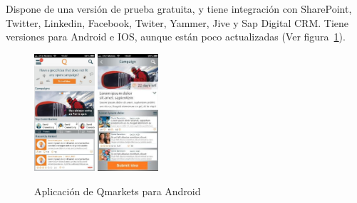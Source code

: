  Dispone de una versión de prueba gratuita, y tiene integración con SharePoint, Twitter, Linkedin, Facebook, Twiter, Yammer, Jive y Sap Digital CRM. Tiene versiones para Android e IOS, aunque están poco actualizadas (Ver figura~\ref{fig:qmarkets}).
 
 \begin{figure}[!h]
 	\begin{center}
 		\includegraphics[width=0.2\textwidth]{./img/competencia/qmarkets/1.jpg}
 		\includegraphics[width=0.2\textwidth]{./img/competencia/qmarkets/2.jpg}
 		\caption{Aplicación de Qmarkets para Android}
 		\label{fig:qmarkets}
 	\end{center}
 \end{figure}


